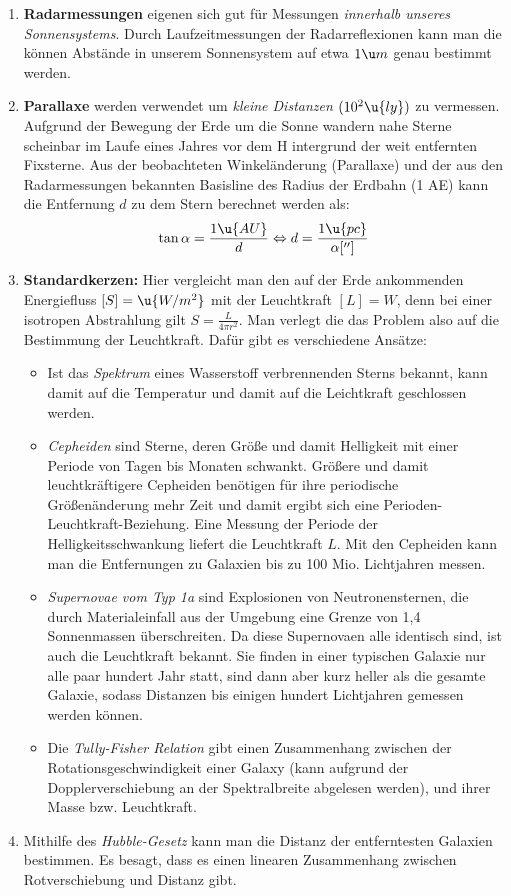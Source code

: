 \documentclass[final]{summery_5.0}
\begin{document}
\begin{enumerate}
    \item {\bf Radarmessungen} eigenen sich gut für Messungen \emph{innerhalb unseres Sonnensystems}. Durch Laufzeitmessungen der Radarreflexionen kann man die können Abstände in unserem Sonnensystem auf etwa $1\u m$ genau bestimmt werden.
    \item {\bf Parallaxe} werden verwendet um \emph{kleine Distanzen} $(10^2\u{ly})$ zu vermessen. Aufgrund der Bewegung der Erde um die Sonne wandern nahe Sterne
    scheinbar im Laufe eines Jahres vor dem H   intergrund der weit entfernten Fixsterne.
    Aus der beobachteten Winkeländerung (Parallaxe) und der aus den Radarmessungen
    bekannten Basisline des Radius der Erdbahn (1 AE) kann die Entfernung
    $d$ zu dem Stern berechnet werden als:
    \begin{align*}
        \tan\alpha = \frac{1\u{AU}}{d} \Leftrightarrow  d  = \frac{1\u{pc}}{\alpha['']}
    \end{align*}
    \item{\bf Standardkerzen:} Hier vergleicht man den auf der Erde ankommenden Energiefluss $[S]=\u{W/m^2}$ mit der Leuchtkraft $[L]=W$, denn bei einer isotropen Abstrahlung gilt $S = \frac{L}{4\pi r^2}$. Man verlegt die das Problem also auf die Bestimmung der Leuchtkraft. Dafür gibt es verschiedene Ansätze:
    \begin{itemize}
        \item Ist das \emph{Spektrum} eines Wasserstoff verbrennenden Sterns bekannt, kann damit auf die Temperatur und damit auf die Leichtkraft geschlossen werden.
        \item \emph{Cepheiden} sind Sterne, deren Größe und damit Helligkeit mit einer Periode von Tagen bis Monaten schwankt. Größere und damit leuchtkräftigere Cepheiden benötigen für ihre periodische Größenänderung mehr Zeit und damit ergibt sich eine Perioden-Leuchtkraft-Beziehung. Eine Messung der Periode der
        Helligkeitsschwankung liefert die Leuchtkraft $L$. Mit den Cepheiden kann man die Entfernungen zu Galaxien bis zu 100 Mio. Lichtjahren messen.
        \item {\emph{Supernovae vom Typ 1a}} sind Explosionen von Neutronensternen, die durch Materialeinfall aus der Umgebung eine Grenze von 1,4
        Sonnenmassen überschreiten. Da diese Supernovaen alle identisch sind, ist auch die Leuchtkraft bekannt. Sie finden in einer typischen Galaxie nur alle paar hundert Jahr statt, sind dann aber kurz heller als die gesamte Galaxie, sodass Distanzen bis einigen hundert Lichtjahren gemessen werden können. 
        \item Die \emph{Tully-Fisher Relation} gibt einen Zusammenhang zwischen der Rotationsgeschwindigkeit einer Galaxy (kann aufgrund der Dopplerverschiebung an der Spektralbreite abgelesen werden), und ihrer Masse bzw. Leuchtkraft.
    \end{itemize}
    \item Mithilfe des \emph{Hubble-Gesetz} kann man die Distanz der entferntesten Galaxien bestimmen. Es besagt, dass es einen linearen Zusammenhang zwischen Rotverschiebung und Distanz gibt. 
\end{enumerate}
\end{document}
